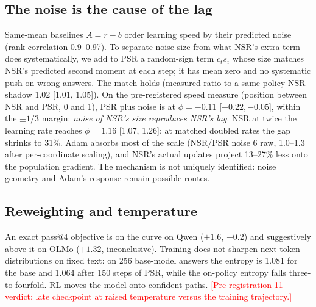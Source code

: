 \documentclass{article}
\theoremstyle{plain}
\theoremstyle{remark}
\newcommand{\pending}[1]{\textcolor{red}{[#1]}}
\begin{document}
\begin{table}[t]
\caption{Matched-accuracy differences in pass@16 (points; 90\% bootstrap intervals over problems, pooled over seeds). All 90\% intervals inside $\pm2$ are average equivalence.}
\label{tab:audit}
\centering\small
{}
\end{table}

\subsection{The noise is the cause of the lag}
Same-mean baselines $A=r-b$ order learning speed by their predicted noise (rank correlation 0.9--0.97). To separate noise size from what NSR's extra term does systematically, we add to PSR a random-sign term $c_ts_i$ whose size matches NSR's predicted second moment at each step; it has mean zero and no systematic push on wrong answers. The match holds (measured ratio to a same-policy NSR shadow 1.02 [1.01, 1.05]). On the pre-registered speed measure (position between NSR and PSR, 0 and 1), PSR plus noise is at $\phi=-0.11$ [$-0.22,-0.05$], within the $\pm1/3$ margin: \emph{noise of NSR's size reproduces NSR's lag}. NSR at twice the learning rate reaches $\phi=1.16$ [1.07, 1.26]; at matched doubled rates the gap shrinks to 31\%. Adam absorbs most of the scale (NSR/PSR noise 6 raw, 1.0--1.3 after per-coordinate scaling), and NSR's actual updates project 13--27\% less onto the population gradient. The mechanism is not uniquely identified: noise geometry and Adam's response remain possible routes.

\subsection{Reweighting and temperature}
An exact pass@4 objective \citep{walder2025pkpo} is on the curve on Qwen ($+1.6$, $+0.2$) and suggestively above it on OLMo ($+1.32$, inconclusive). Training does not sharpen next-token distributions on fixed text: on 256 base-model answers the entropy is 1.081 for the base and 1.064 after 150 steps of PSR, while the on-policy entropy falls three- to fourfold. RL moves the model onto confident paths. \pending{Pre-registration 11 verdict: late checkpoint at raised temperature versus the training trajectory.}
\end{document}
